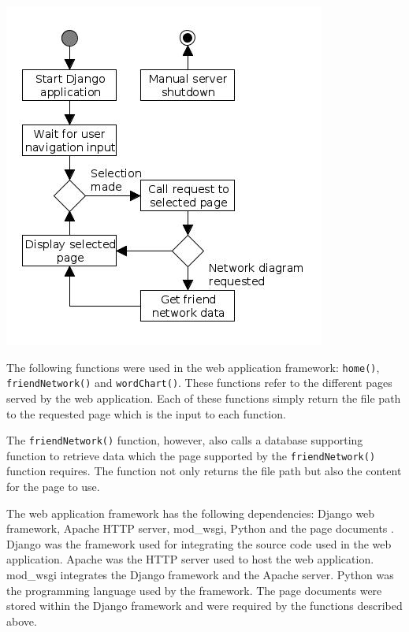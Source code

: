 \documentclass[12pt,onecolumn]{article}
\begin{document}
	\begin{center} 
		\includegraphics[width=\textwidth]{djangostruc}
		 \label{fig:django}
	\end{center}
	
	The following functions were used in the web application framework: \texttt{home()}, \texttt{friendNetwork()} and \texttt{wordChart()}. These functions refer to the different pages served by the web application. Each of these functions simply return the file path to the requested page which is the input to each function.
	
	The \texttt{friendNetwork()} function, however, also calls a database supporting function to retrieve data which the page supported by the \texttt{friendNetwork()} function requires. The function not only returns the file path but also the content for the page to use.
	
	The web application framework has the following dependencies: Django web framework, Apache HTTP server, mod\_wsgi, Python  and the page documents \cite{django, apache, wsgi}. Django was the framework used for integrating the source code used in the web application. Apache was the HTTP server used to host the web application. mod\_wsgi integrates the Django framework and the Apache server. Python was the programming language used by the framework. The page documents were stored within the Django framework and were required by the functions described above. 
	
\end{document}

